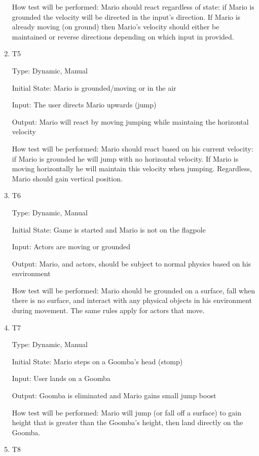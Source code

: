 \documentclass[12pt, titlepage]{article}
\begin{document}
\begin{enumerate}
How test will be performed: Mario should react regardless of state: if Mario is grounded the velocity will be directed in the input's direction. If Mario is already moving (on ground) then Mario's velocity should either be maintained or reverse directions depending on which input in provided.

\item{T5\\}

Type: Dynamic, Manual

Initial State: Mario is grounded/moving or in the air

Input: The user directs Mario upwards (jump)

Output: Mario will react by moving jumping while maintaing the horizontal velocity

How test will be performed: Mario should react based on his current velocity: if Mario is grounded he will jump with no horizontal velocity. If Mario is moving horizontally he will maintain this velocity when jumping. Regardless, Mario should gain vertical position.

\item{T6\\}

Type: Dynamic, Manual

Initial State: Game is started and Mario is not on the flagpole

Input: Actors are moving or grounded

Output: Mario, and actors, should be subject to normal physics based on his environment

How test will be performed: Mario should be grounded on a surface, fall when there is no surface, and interact with any physical objects in his environment during movement. The same rules apply for actors that move.

\item{T7\\}

Type: Dynamic, Manual

Initial State: Mario steps on a Goomba's head (stomp)

Input: User lands on a Goomba

Output: Goomba is eliminated and Mario gains small jump boost

How test will be performed: Mario will jump (or fall off a surface) to gain height that is greater than the Goomba's height, then land directly on the Goomba.

\item{T8\\}


\end{enumerate}
\end{document}
